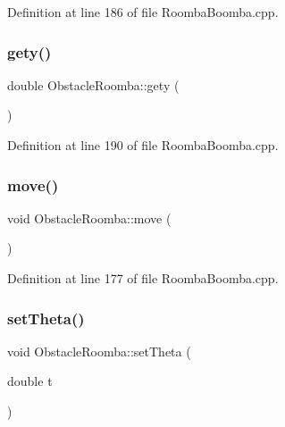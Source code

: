 Definition at line 186 of file Roomba\+Boomba.\+cpp.

\mbox{\label{classObstacleRoomba_adeea6821d17c665734b82a5dab6c4576}} 
\subsubsection{\texorpdfstring{gety()}{gety()}}
{\footnotesize\ttfamily double Obstacle\+Roomba\+::gety (\begin{DoxyParamCaption}{ }\end{DoxyParamCaption})\hspace{0.3cm}{\ttfamily [inline]}}



Definition at line 190 of file Roomba\+Boomba.\+cpp.

\mbox{\label{classObstacleRoomba_ad55afc5449e70511b0831c694d72cb97}} 
\subsubsection{\texorpdfstring{move()}{move()}}
{\footnotesize\ttfamily void Obstacle\+Roomba\+::move (\begin{DoxyParamCaption}{ }\end{DoxyParamCaption})\hspace{0.3cm}{\ttfamily [inline]}}



Definition at line 177 of file Roomba\+Boomba.\+cpp.

\mbox{\label{classObstacleRoomba_a98517d5de274bcf1e112afa78fe03ad1}} 
\subsubsection{\texorpdfstring{setTheta()}{setTheta()}}
{\footnotesize\ttfamily void Obstacle\+Roomba\+::set\+Theta (\begin{DoxyParamCaption}\item[{double}]{t }\end{DoxyParamCaption})\hspace{0.3cm}{\ttfamily [inline]}}



